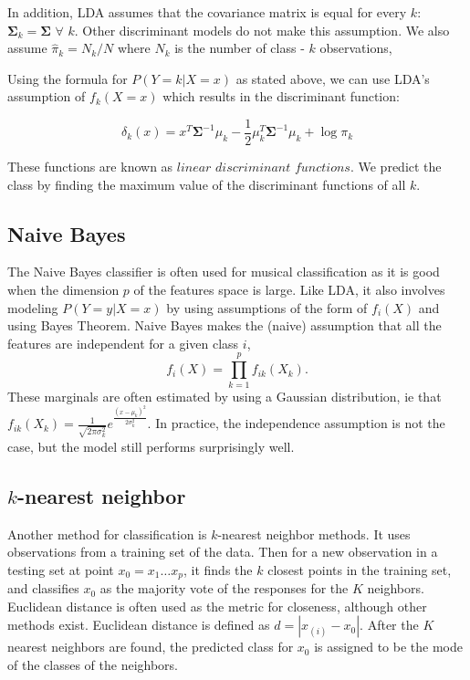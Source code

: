 \documentclass[12pt,twoside]{reedthesis}
\theoremstyle{definition}
\theoremstyle{definition}
\theoremstyle{definition}
\theoremstyle{remark}
\begin{document}
In addition, LDA assumes that the covariance matrix is equal for every
\(k\): \(\mathbf{\Sigma}_k = \mathbf{\Sigma}\) \(\forall\) \(k\). Other
discriminant models do not make this assumption. We also assume
\(\hat{\pi}_k = N_k/N\) where \(N_k\) is the number of class - \(k\)
observations,

Using the formula for \(P(Y = k|X=x)\) as stated above, we can use LDA's
assumption of \(f_k(X = x)\) which results in the discriminant function:

\[ \delta_k(x) = x^T\mathbf{\Sigma}^{-1}\mu_k - \frac{1}{2}\mu_k^T\mathbf{\Sigma}^{-1}\mu_k + \log \pi_k \]

These functions are known as \(\textit{linear discriminant functions}\).
We predict the class by finding the maximum value of the discriminant
functions of all \(k\).

\subsection{Naive Bayes}\label{naive-bayes}

The Naive Bayes classifier is often used for musical classification as
it is good when the dimension \(p\) of the features space is large. Like
LDA, it also involves modeling \(P(Y = y | X =x)\) by using assumptions
of the form of \(f_i(X)\) and using Bayes Theorem. Naive Bayes makes the
(naive) assumption that all the features are independent for a given
class \(i\), \[f_i(X) = \prod_{k = 1}^p f_{ik}(X_k).\] These marginals
are often estimated by using a Gaussian distribution, ie that
\(f_{ik}(X_k) = \frac{1}{\sqrt{2\pi\sigma_k^2}}e^{\frac{(x - \mu_k)^2}{2\sigma_k^2}}\).
In practice, the independence assumption is not the case, but the model
still performs surprisingly well.

\subsection{\texorpdfstring{\(k\)-nearest
neighbor}{k-nearest neighbor}}\label{k-nearest-neighbor}

Another method for classification is \(k\)-nearest neighbor methods. It
uses observations from a training set of the data. Then for a new
observation in a testing set at point \(x_0 = x_1 \ldots x_p\), it finds
the \(k\) closest points in the training set, and classifies \(x_0\) as
the majority vote of the responses for the \(K\) neighbors. Euclidean
distance is often used as the metric for closeness, although other
methods exist. Euclidean distance is defined as \(d = |x_{(i)} - x_0|\).
After the \(K\) nearest neighbors are found, the predicted class for
\(x_0\) is assigned to be the mode of the classes of the neighbors.
\end{document}
